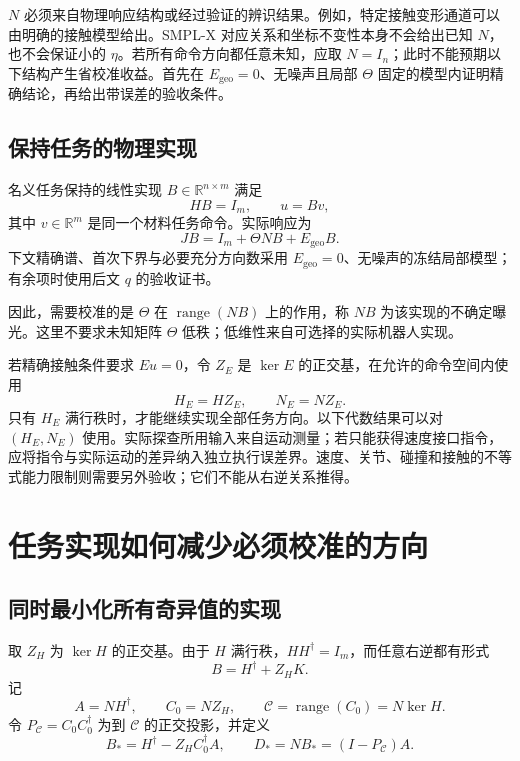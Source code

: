\documentclass[11pt,a4paper]{article}
\numberwithin{equation}{section}
\theoremstyle{definition}
\begin{document}
$N$ 必须来自物理响应结构或经过验证的辨识结果。例如，特定接触变形通道可以由明确的接触模型给出。SMPL-X 对应关系和坐标不变性本身不会给出已知 $N$，也不会保证小的 $\eta$。若所有命令方向都任意未知，应取 $N=I_n$；此时不能预期以下结构产生省校准收益。首先在 $E_{\mathrm{geo}}=0$、无噪声且局部 $\Theta$ 固定的模型内证明精确结论，再给出带误差的验收条件。

\subsection{保持任务的物理实现}

名义任务保持的线性实现 $B\in\mathbb R^{n\times m}$ 满足
\begin{equation}
  HB=I_m,\qquad u=Bv ,
  \label{eq:cal-lift}
\end{equation}
其中 $v\in\mathbb R^m$ 是同一个材料任务命令。实际响应为
\begin{equation}
  JB=I_m+\Theta NB+E_{\mathrm{geo}}B .
  \label{eq:cal-exposure}
\end{equation}
下文精确谱、首次下界与必要充分方向数采用 $E_{\mathrm{geo}}=0$、无噪声的冻结局部模型；有余项时使用后文 $q$ 的验收证书。

因此，需要校准的是 $\Theta$ 在 $\operatorname{range}(NB)$ 上的作用，称 $NB$ 为该实现的不确定曝光。这里不要求未知矩阵 $\Theta$ 低秩；低维性来自可选择的实际机器人实现。

若精确接触条件要求 $Eu=0$，令 $Z_E$ 是 $\ker E$ 的正交基，在允许的命令空间内使用
\begin{equation}
  H_E=HZ_E,\qquad N_E=NZ_E .
  \label{eq:cal-contact-reduction}
\end{equation}
只有 $H_E$ 满行秩时，才能继续实现全部任务方向。以下代数结果可以对 $(H_E,N_E)$ 使用。实际探查所用输入来自运动测量；若只能获得速度接口指令，应将指令与实际运动的差异纳入独立执行误差界。速度、关节、碰撞和接触的不等式能力限制则需要另外验收；它们不能从右逆关系推得。

\section{任务实现如何减少必须校准的方向}
\label{sec:cal-realization}

\subsection{同时最小化所有奇异值的实现}

取 $Z_H$ 为 $\ker H$ 的正交基。由于 $H$ 满行秩，$HH^\dagger=I_m$，而任意右逆都有形式
\begin{equation}
  B=H^\dagger+Z_HK .
  \label{eq:cal-all-lifts}
\end{equation}
记
\begin{equation}
  A=NH^\dagger,\qquad C_0=NZ_H,\qquad
  \mathcal C=\operatorname{range}(C_0)=N\ker H .
\end{equation}
令 $P_{\mathcal C}=C_0C_0^\dagger$ 为到 $\mathcal C$ 的正交投影，并定义
\begin{equation}
  B_*=
  H^\dagger-Z_HC_0^\dagger A,\qquad
  D_*=
  NB_*=(I-P_{\mathcal C})A .
  \label{eq:cal-optimal-lift}
\end{equation}
\end{document}

